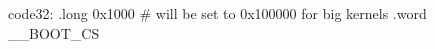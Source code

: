 \documentclass[varwidth=31em,crop]{standalone}
\begin{document}
\begin{gascode}
code32: .long 0x1000 # will be set to 0x100000 for big kernels
        .word __BOOT_CS  
\end{gascode}
\end{document}
